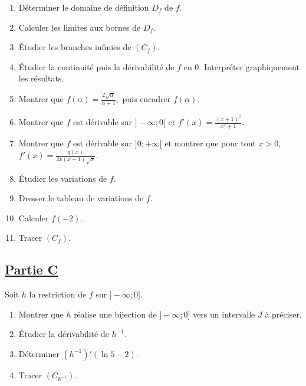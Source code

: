 \documentclass[12pt,a4paper]{article}
\begin{document}
    \begin{enumerate}
        \item Déterminer le domaine de définition \( D_f \) de \( f \).
        \item Calculer les limites aux bornes de \( D_f \).
        \item Étudier les branches infinies de \( (C_f) \).
        \item Étudier la continuité puis la dérivabilité de \( f \) en 0. Interpréter graphiquement les résultats.
        \item Montrer que \(     f(\alpha) = \frac{2\sqrt{\alpha}}{\alpha + 1}, \)
              puis encadrer \( f(\alpha) \).
        \item Montrer que \( f \) est dérivable sur \( ]-\infty; 0[ \) et  \(     f'(x) = \frac{(x+1)^2}{x^2 + 1}. \)

        \item Montrer que \( f \) est dérivable sur \( ]0; +\infty[ \) et montrer que pour tout \( x > 0 \),  \( f'(x) = \frac{g(x)}{2x(x+1)\sqrt{x}}. \)

        \item Étudier les variations de \( f \).
        \item Dresser le tableau de variations de \( f \).
        \item Calculer \( f(-2) \).
        \item Tracer \( (C_f) \).
    \end{enumerate}

    \subsection*{\underline{\textbf{Partie C}}}

    Soit \( h \) la restriction de \( f \) sur \( ]-\infty; 0] \).

\begin{enumerate}
    \item Montrer que \( h \) réalise une bijection de \( ]-\infty; 0] \) vers un intervalle \( J \) à préciser.
    \item Étudier la dérivabilité de \( h^{-1} \).
    \item Déterminer \( (h^{-1})'(\ln 5 - 2) \).
    \item Tracer \( (C_{h^{-1}}) \).
\end{enumerate}
\section*{}
\end{document}
